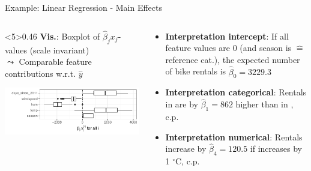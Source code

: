 \documentclass[11pt,compress,t,notes=noshow, aspectratio=169, xcolor=table]{beamer}
\begin{document}
\begin{frame}{Example: Linear Regression - Main Effects}
\lz
\begin{columns}[T, totalwidth=\linewidth]
\begin{column}<5>{0.46\textwidth}
\textbf{Vis.}: Boxplot of $\hat\beta_j x_j$-values (scale invariant)\\
$\leadsto$ Comparable feature contributions w.r.t. $\hat y$

\includegraphics[width = \textwidth]{figure/plot_lin_effect.pdf}

%
\end{column}\hfill
\begin{column}{0.54\textwidth}  %

\begin{itemize}[<+->]
    \item \textbf{Interpretation intercept}:
    If all feature values are 0 (and season is  $\hat =$ reference cat.), the expected number of bike rentals is $\hat\beta_0 = 3229.3$
    \item \textbf{Interpretation categorical}: Rentals in  are by $\hat\beta_1 = 862$ higher than in , c.p.
    \item \textbf{Interpretation numerical}: Rentals increase by $\hat\beta_4 = 120.5$ if  increases by 1 $^{\circ}$C, c.p.

\end{itemize}
\end{column}
\end{columns}
\end{frame}


\end{document}
